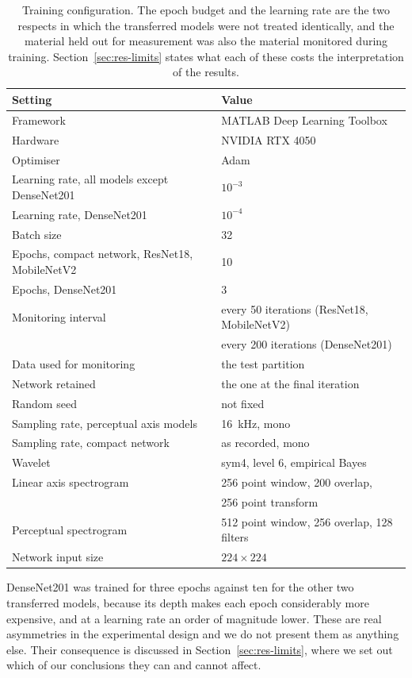 \begin{table}[t]
\centering
\footnotesize
\caption{Training configuration. The epoch budget and the learning rate are
the two respects in which the transferred models were not treated
identically, and the material held out for measurement was also the material
monitored during training. Section~\ref{sec:res-limits} states what each of
these costs the interpretation of the results.}
\label{tab:train}
\begin{tabular}{@{}ll@{}}
\toprule
Setting & Value \\
\midrule
Framework & MATLAB Deep Learning Toolbox \\
Hardware & NVIDIA RTX 4050 \\
Optimiser & Adam \\
Learning rate, all models except DenseNet201 & $10^{-3}$ \\
Learning rate, DenseNet201 & $10^{-4}$ \\
Batch size & 32 \\
Epochs, compact network, ResNet18, MobileNetV2 & 10 \\
Epochs, DenseNet201 & 3 \\
Monitoring interval & every 50 iterations (ResNet18, MobileNetV2) \\
 & every 200 iterations (DenseNet201) \\
Data used for monitoring & the test partition \\
Network retained & the one at the final iteration \\
Random seed & not fixed \\
Sampling rate, perceptual axis models & 16~kHz, mono \\
Sampling rate, compact network & as recorded, mono \\
Wavelet & sym4, level 6, empirical Bayes \\
Linear axis spectrogram & 256 point window, 200 overlap, \\
 & 256 point transform \\
Perceptual spectrogram & 512 point window, 256 overlap, 128 filters \\
Network input size & $224 \times 224$ \\
\bottomrule
\end{tabular}
\end{table}

DenseNet201 was trained for three epochs against ten for the other two
transferred models, because its depth makes each epoch considerably more
expensive, and at a learning rate an order of magnitude lower. These are real
asymmetries in the experimental design and we do not present them as anything
else. Their consequence is discussed in Section~\ref{sec:res-limits}, where we
set out which of our conclusions they can and cannot affect.

